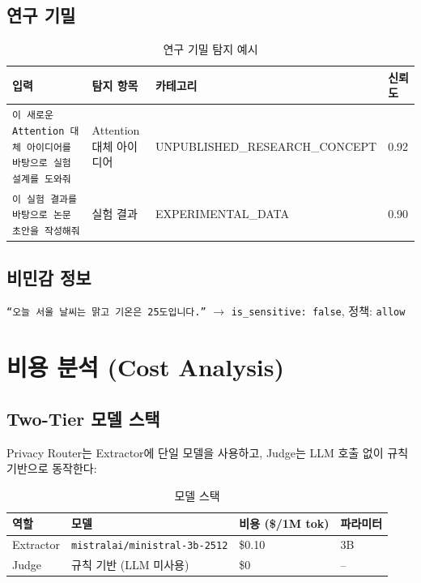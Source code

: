 \documentclass[11pt,a4paper]{article}
\begin{document}
\subsection{연구 기밀}

\begin{table}[h]
\centering
\begin{tabular}{@{}p{5cm}lll@{}}
\toprule
입력 & 탐지 항목 & 카테고리 & 신뢰도 \\
\midrule
\texttt{이 새로운 Attention 대체 아이디어를 바탕으로 실험 설계를 도와줘} & Attention 대체 아이디어 & UNPUBLISHED\_RESEARCH\_CONCEPT & 0.92 \\
\texttt{이 실험 결과를 바탕으로 논문 초안을 작성해줘} & 실험 결과 & EXPERIMENTAL\_DATA & 0.90 \\
\bottomrule
\end{tabular}
\caption{연구 기밀 탐지 예시}
\end{table}

\subsection{비민감 정보}

\texttt{``오늘 서울 날씨는 맑고 기온은 25도입니다.''} $\rightarrow$ \texttt{is\_sensitive: false}, 정책: \texttt{allow}

\section{비용 분석 (Cost Analysis)}

\subsection{Two-Tier 모델 스택}

Privacy Router는 Extractor에 단일 모델을 사용하고, Judge는 LLM 호출 없이 규칙 기반으로 동작한다:

\begin{table}[h]
\centering
\begin{tabular}{@{}llll@{}}
\toprule
역할 & 모델 & 비용 (\$/1M tok) & 파라미터 \\
\midrule
Extractor & \texttt{mistralai/ministral-3b-2512} & \$0.10 & 3B \\
Judge & 규칙 기반 (LLM 미사용) & \$0 & -- \\
\bottomrule
\end{tabular}
\caption{모델 스택}
\end{table}
\end{document}

